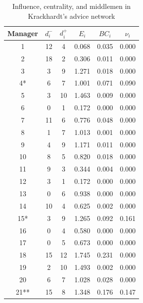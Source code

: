 \documentclass[11pt,fleqn]{article}
\begin{document}
\begin{table}[h]
\begin{center}
\begin{tabular}{|c|ccccc|}
\toprule
Manager       & $d^-_i$ & $d^+_i$& $E_i$    & $BC_i$   & $\nu_i$      \\
\midrule
1             & 12 & 4           & 0.068    & 0.035    & 0.000 \\
2             & 18 & 2           & 0.306    & 0.011    & 0.000 \\
3             & 3 & 9            & 1.271    & 0.018    & 0.000 \\
4*          & 6 & 7            & 1.001    & 0.071    & 0.090 \\
5             & 3 & 10           & 1.463    & 0.009    & 0.000 \\
6             & 0 & 1            & 0.172    & 0.000    & 0.000 \\
7             & 11 & 6           & 0.776    & 0.048    & 0.000 \\
8             & 1 & 7            & 1.013    & 0.001    & 0.000 \\
9             & 4 & 9            & 1.171    & 0.011    & 0.000 \\
10            & 8 & 5            & 0.820    & 0.018    & 0.000 \\
11            & 9 & 3            & 0.344    & 0.004    & 0.000 \\
12            & 3 & 1            & 0.172    & 0.000    & 0.000 \\
13            & 0 & 6            & 0.938    & 0.000    & 0.000 \\
14            & 10 & 4           & 0.625    & 0.002    & 0.000 \\
15*         & 3 & 9            & 1.265    & 0.092    & 0.161 \\
16            & 0 & 4            & 0.580    & 0.000    & 0.000 \\
17            & 0 & 5            & 0.673    & 0.000    & 0.000 \\
18            & 15 & 12          & 1.745    & 0.231    & 0.000 \\
19            & 2 & 10           & 1.493    & 0.002    & 0.000 \\
20            & 6 & 7            & 1.028    & 0.028    & 0.000 \\
21**        & 15 & 8           & 1.348    & 0.176    & 0.147 \\
\bottomrule
\end{tabular}
\caption{Influence, centrality, and middlemen in Krackhardt's advice network}
\label{tabkrackhardt}
\end{center}
\end{table}
\end{document}
